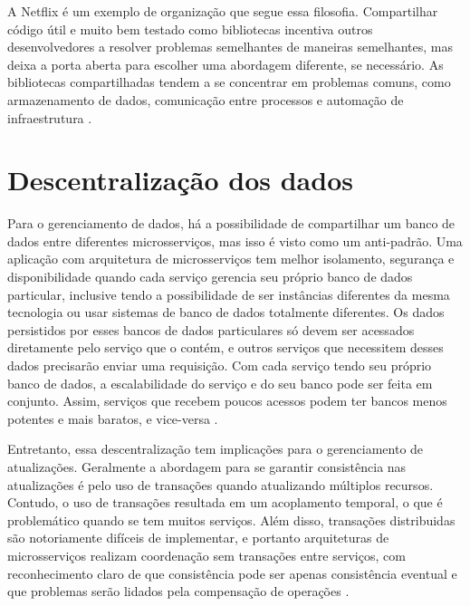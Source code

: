 A Netflix é um exemplo de organização que segue essa filosofia. Compartilhar código útil e muito bem testado como bibliotecas incentiva outros desenvolvedores a resolver problemas semelhantes de maneiras semelhantes, mas deixa a porta aberta para escolher uma abordagem diferente, se necessário. As bibliotecas compartilhadas tendem a se concentrar em problemas comuns, como armazenamento de dados, comunicação entre processos e automação de infraestrutura \cite{martin-fowler-microservices}.

\section{Descentralização dos dados}

Para o gerenciamento de dados, há a possibilidade de compartilhar um banco de dados entre diferentes microsserviços, mas isso é visto como um anti-padrão. Uma aplicação com arquitetura de microsserviços tem melhor isolamento, segurança e disponibilidade quando cada serviço gerencia seu próprio banco de dados particular, inclusive tendo a possibilidade de ser instâncias diferentes da mesma tecnologia ou usar sistemas de banco de dados totalmente diferentes. Os dados persistidos por esses bancos de dados particulares só devem ser acessados diretamente pelo serviço que o contém, e outros serviços que necessitem desses dados precisarão enviar uma requisição. Com cada serviço tendo seu próprio banco de dados, a escalabilidade do serviço e do seu banco pode ser feita em conjunto. Assim, serviços que recebem poucos acessos podem ter bancos menos potentes e mais baratos, e vice-versa \cite{oracle_microservices,martin-fowler-microservices}.

Entretanto, essa descentralização tem implicações para o gerenciamento de atualizações. Geralmente a abordagem para se garantir consistência nas atualizações é pelo uso de transações quando atualizando múltiplos recursos. Contudo, o uso de transações resultada em um acoplamento temporal, o que é problemático quando se tem muitos serviços. Além disso, transações distribuidas são notoriamente difíceis de implementar, e portanto arquiteturas de microsserviços realizam coordenação sem transações entre serviços, com reconhecimento claro de que consistência pode ser apenas consistência eventual e que problemas serão lidados pela compensação de operações \cite{martin-fowler-microservices}.


